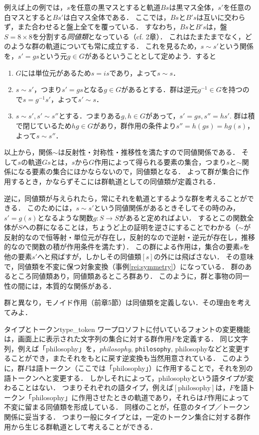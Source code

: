 \documentclass[11pt,a4paper]{jsarticle}
\begin{document}
例えば上の例では，$s$を任意の黒マスとすると軌道$Bs$は黒マス全体，$s'$を任意の白マスとすると$Bs'$は白マス全体である．
ここでは，$Bs$と$B's$は互いに交わらず，また合わせると盤上全てを覆っている．
すなわち，$Bs$と$B's$は，盤$S = 8 \times 8$を分割する\emph{同値類}となっている（cf. 2章）．
これはたまたまでなく，どのような群の軌道についても常に成立する．
これを見るため，$s \sim s'$という関係を，$s' = gs$という元$g \in G$があるということとして定めよう．すると
\begin{enumerate}
 \item $G$には単位元があるため$s = is$であり，よって$s \sim s$．
 \item $s \sim s'$，つまり$s' = gs$となる$g \in G$があるとする．群は逆元$g^{-1} \in G$を持つので$s = g^{-1}s'$，よって$s' \sim s$．
 \item $s \sim s', s' \sim s''$とする．つまりある$g, h \in G$があって，$s' = gs, s'' = hs'$. 
       群は積で閉じているため$hg \in G$があり，群作用の条件より$s'' = h(gs) = hg(s)$，よって$s \sim s''$．
\end{enumerate}
以上から，関係$\sim$は反射性・対称性・推移性を満たすので同値関係である．
そして$s$の軌道$Gs$とは，$s$から$G$作用によって得られる要素の集合，つまり$s$と$\sim$関係になる要素の集合にほかならないので，同値類となる．
よって群が集合に作用するとき，かならずそこには群軌道としての同値類が定義される．

逆に，同値類が与えられたら，常にそれを軌道とするような群を考えることができる．
このためには，$s \sim s'$という同値関係があるときそしてその時のみ，$s' = g(s)$となるような関数$g:S \to S$があると定めればよい．
するとこの関数全体が$S$への群になることは，ちょうど上の証明を逆さにすることでわかる（$\sim$が反射的なので恒等射・単位元が存在し，反射的なので逆射・逆元が存在し，推移的なので関数の積が作用条件を満たす）．
この群による作用は，集合の要素$s$を他の要素$s'$へと飛ばすが，しかしその同値類$[s]$の外には飛ばさない．
その意味で，同値類を不変に保つ対象変換（事例\ref{rei:symmetry}）になっている．
群のあるところ同値類あり，同値類あるところ群あり．
このように，群と事物の同一性の間には，本質的な関係がある．

\begin{renshu}{}{}
 群と異なり，モノイド作用（前章5節）は同値類を定義しない．その理由を考えてみよ．
\end{renshu}

\begin{rei}{タイプとトークン}{type_token}
ワープロソフトに付いているフォントの変更機能は，画面上に表示された文字列の集合に対する群作用$F$を定義する．
同じ文字列，例えば「philosophy」を，\textit{philosophy}, \texttt{philosophy}, \textsf{philosophy}などと変更することができ，またそれをもとに戻す逆変換も当然用意されている．
このように，群$F$は語トークン（ここでは「philosophy」）に作用することで，それを別の語トークンへと変更する．
しかしそれによって，philosophyという語タイプが変わることはない．
つまりそれぞれの語タイプ，例えば$[\text{philosophy}]$は，$F$を語トークン「philosophy」に作用させたときの軌道であり，それらは$F$作用によって不変に留まる同値類を形成している．
同様のことが，任意のタイプ／トークン関係に妥当する．
つまり一般にタイプとは，一定のトークン集合に対する群作用から生じる群軌道として考えることができる．
\end{rei}
\end{document}
